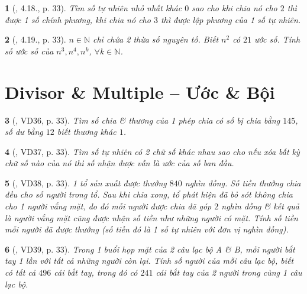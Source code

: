 \documentclass{article}
\newtheorem{baitoan}{}
\begin{document}
\begin{baitoan}[\cite{TLCT_THCS_Toan_6_so_hoc}, 4.18., p. 33]
	Tìm số tự nhiên nhỏ nhất khác $0$ sao cho khi chia nó cho $2$ thì được 1 số chính phương, khi chia nó cho $3$ thì được lập phương của 1 số tự nhiên.
\end{baitoan}

\begin{baitoan}[\cite{TLCT_THCS_Toan_6_so_hoc}, 4.19., p. 33]
	$n\in\mathbb{N}$ chỉ chứa 2 thừa số nguyên tố. Biết $n^2$ có $21$ ước số. Tính số ước số của $n^3,n^4,n^k$, $\forall k\in\mathbb{N}$.
\end{baitoan}


\section{Divisor \& Multiple -- Ước \& Bội}

\begin{baitoan}[\cite{Binh_Toan_6_tap_1}, VD36, p. 33]
	Tìm số chia \& thương của 1 phép chia có số bị chia bằng $145$, số dư bằng $12$ biết thương khác $1$.
\end{baitoan}

\begin{baitoan}[\cite{Binh_Toan_6_tap_1}, VD37, p. 33]
	Tìm số tự nhiên có 2 chữ số khác nhau sao cho nếu xóa bất kỳ chữ số nào của nó thì số nhận được vẫn là ước của số ban đầu.
\end{baitoan}

\begin{baitoan}[\cite{Binh_Toan_6_tap_1}, VD38, p. 33]
	1 tổ sản xuất được thưởng $840$ nghìn đồng. Số tiền thưởng chia đều cho số người trong tổ. Sau khi chia xong, tổ phát hiện đã bỏ sót không chia cho 1 người vắng mặt, do đó mỗi người được chia đã góp $2$ nghìn đồng \& kết quả là người vắng mặt cũng được nhận số tiền như những người có mặt. Tính số tiền mỗi người đã được thưởng (số tiền đó là 1 số tự nhiên với đơn vị nghìn đồng).
\end{baitoan}

\begin{baitoan}[\cite{Binh_Toan_6_tap_1}, VD39, p. 33]
	Trong 1 buổi họp mặt của 2 câu lạc bộ A \& B, mỗi người bắt tay 1 lần với tất cả những người còn lại. Tính số người của mỗi câu lạc bộ, biết có tất cả $496$ cái bắt tay, trong đó có $241$ cái bắt tay của 2 người trong cùng 1 câu lạc bộ.
\end{baitoan}
\end{document}
